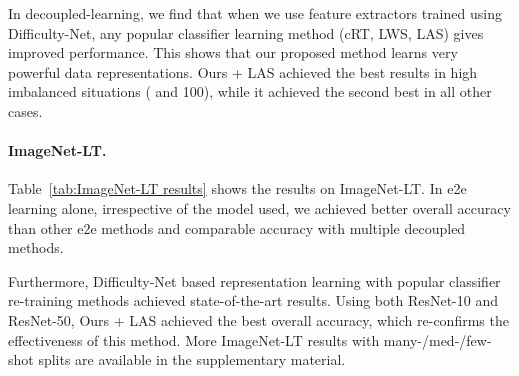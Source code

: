 \documentclass[10pt,twocolumn,letterpaper]{article}
\begin{document}
In decoupled-learning, we find that when we use feature extractors trained using Difficulty-Net, any popular classifier learning method (\eg cRT, LWS, LAS) gives improved performance. 
This shows that our proposed method learns very powerful data representations. 
Ours + LAS achieved the best results in high imbalanced situations ( and 100), while it achieved the second best in all other cases.


\paragraph{\bf ImageNet-LT.} 
Table~\ref{tab:ImageNet-LT results} shows the results on ImageNet-LT.
In e2e learning alone, irrespective of the model used, we achieved better overall accuracy than other e2e 
methods and comparable accuracy with multiple decoupled 
methods.

Furthermore, Difficulty-Net based representation learning with popular classifier re-training methods achieved state-of-the-art results. Using both ResNet-10 and ResNet-50, Ours + LAS achieved the best overall accuracy, which re-confirms the effectiveness of this method. More ImageNet-LT results with many-/med-/few-shot splits are available in the supplementary material.
\end{document}
